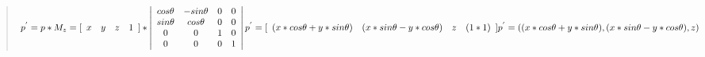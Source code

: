 \documentclass[a4paper,10pt]{article}
\begin{document}
\begin{CJK}{UTF8}{song}
\begin{quote}
\begin{math}
p^{'}=p*M_{z}=[\begin{array}{cccc} x & y & z & 1 \end{array} ]* 
\left|
\begin{array}{cccc}
cos\theta & -sin\theta & 0 & 0  \\
sin\theta & cos\theta & 0 & 0 \\
0 & 0 & 1 & 0 \\
0 & 0 & 0 & 1 \\
\end{array}
\right| \\
p^{'}=[\begin{array}{cccc} (x*cos\theta +y*sin\theta) & (x*sin\theta -y*cos\theta) & z & (1*1) \end{array} ] \\
p^{'}=( (x*cos\theta + y*sin\theta) , (x*sin\theta - y*cos\theta) , z ) 
\end{math}
\end{quote}


\end{CJK}
\end{document}
